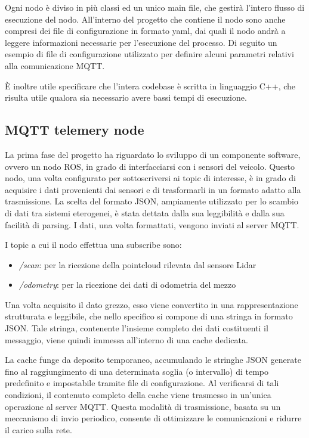 \noindent Ogni nodo è diviso in più classi ed un unico main file, che gestirà l'intero flusso di esecuzione del nodo. All'interno del progetto che contiene il nodo sono anche compresi dei file di configurazione in formato yaml, dai quali il nodo andrà a leggere informazioni necessarie per l'esecuzione del processo. Di seguito un esempio di file di configurazione utilizzato per definire alcuni parametri relativi alla comunicazione MQTT.



\noindent È inoltre utile specificare che l'intera codebase è scritta in linguaggio C++, che risulta utile qualora sia necessario avere bassi tempi di esecuzione.

\subsection{MQTT telemery node} \label{mqtt_telemetry_node}
La prima fase del progetto ha riguardato lo sviluppo di un componente software, ovvero un nodo ROS, in grado di interfacciarsi con i sensori del veicolo. Questo nodo, una volta configurato per sottoscriversi ai topic di interesse, è in grado di acquisire i dati provenienti dai sensori e di trasformarli in un formato adatto alla trasmissione. La scelta del formato JSON, ampiamente utilizzato per lo scambio di dati tra sistemi eterogenei, è stata dettata dalla sua leggibilità e dalla sua facilità di parsing. I dati, una volta formattati, vengono inviati al server MQTT.

\noindent I topic a cui il nodo effettua una subscribe sono:

\begin{itemize}
  \item \textit{/scan}: per la ricezione della pointcloud rilevata dal sensore Lidar
  \item \textit{/odometry}: per la ricezione dei dati di odometria del mezzo
\end{itemize}

\noindent Una volta acquisito il dato grezzo, esso viene convertito in una rappresentazione strutturata e leggibile, che nello specifico si compone di una stringa in formato JSON. Tale stringa, contenente l'insieme completo dei dati costituenti il messaggio, viene quindi immessa all'interno di una cache dedicata.

\noindent La cache funge da deposito temporaneo, accumulando le stringhe JSON generate fino al raggiungimento di una determinata soglia (o intervallo) di tempo predefinito e impostabile tramite file di configurazione. Al verificarsi di tali condizioni, il contenuto completo della cache viene trasmesso in un'unica operazione al server MQTT. Questa modalità di trasmissione, basata su un meccanismo di invio periodico, consente di ottimizzare le comunicazioni e ridurre il carico sulla rete.

